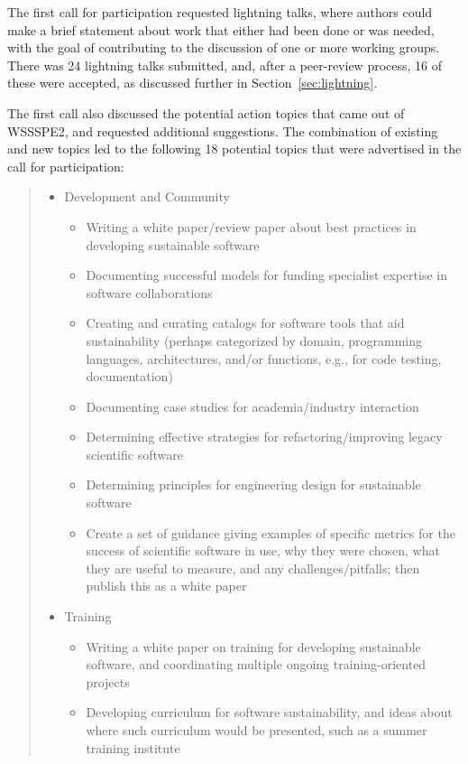 \documentclass[11pt, oneside]{amsart}
\begin{document}
The first call for participation requested lightning talks, where authors could
make a brief statement about work that either had been done or was needed, with
the goal of contributing to the discussion of one or more working groups. There
was 24 lightning talks submitted, and, after a peer-review process, 16 of these
were accepted, as discussed further in Section~\ref{sec:lightning}.

The first call also discussed the potential action topics that came out of
WSSSPE2, and requested additional suggestions. The combination of existing and
new topics led to the following 18 potential topics that were advertised in the
call for participation:


\begin{quote}
\begin{itemize}
\renewcommand{\labelenumi}{\textbf{\theenumi}.}
\setlength{\rightmargin}{1em}

\item Development and Community
\begin{itemize}
\item Writing a white paper/review paper about best practices in developing
sustainable software
\item Documenting successful models for funding specialist expertise in software
collaborations
\item Creating and curating catalogs for software tools that aid sustainability
(perhaps categorized by domain, programming languages, architectures, and/or
functions, e.g., for code testing, documentation)
\item Documenting case studies for academia/industry interaction
\item Determining effective strategies for refactoring/improving legacy
scientific software
\item Determining principles for engineering design for sustainable software
\item Create a set of guidance giving examples of specific metrics for the
success of scientific software in use, why they were chosen, what they are
useful to measure, and any challenges/pitfalls; then publish this as a white
paper
\end{itemize}

\item Training
\begin{itemize}
\item Writing a white paper on training for developing sustainable software, and
coordinating multiple ongoing training-oriented projects
\item Developing curriculum for software sustainability, and ideas about where
such curriculum would be presented, such as a summer training institute
\end{itemize}


\end{itemize}
\end{quote}
\end{document}
